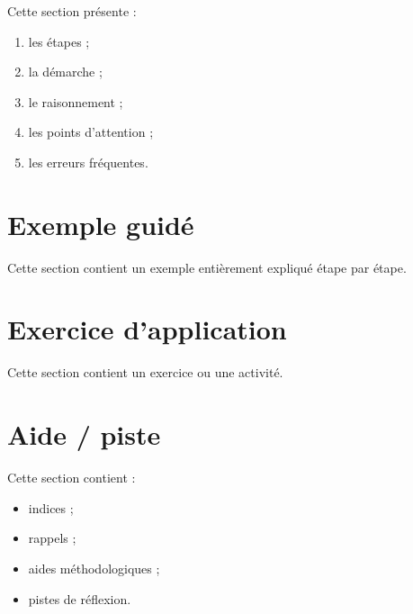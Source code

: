\documentclass[11pt,a4paper]{article}
\begin{document}
\begin{cadremethode}
Cette section présente :
\begin{enumerate}
    \item les étapes ;
    \item la démarche ;
    \item le raisonnement ;
    \item les points d’attention ;
    \item les erreurs fréquentes.
\end{enumerate}
\end{cadremethode}

\section{Exemple guidé}

\begin{cadreexemple}
Cette section contient un exemple entièrement expliqué étape par étape.
\end{cadreexemple}

\section{Exercice d’application}

\begin{cadreenonce}
Cette section contient un exercice ou une activité.
\end{cadreenonce}

\section{Aide / piste}

\begin{cadreaide}
Cette section contient :
\begin{itemize}
    \item indices ;
    \item rappels ;
    \item aides méthodologiques ;
    \item pistes de réflexion.
\end{itemize}
\end{cadreaide}
\end{document}
